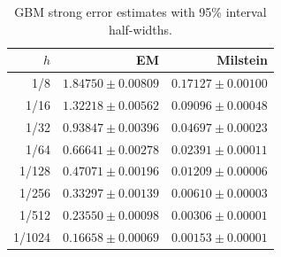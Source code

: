 \begin{table}[H]\centering\small
\caption{GBM strong error estimates with 95\% interval half-widths.}
\begin{tabular}{rrr}\toprule
$h$ & EM & Milstein\\\midrule
1/8 & $1.84750\pm0.00809$ & $0.17127\pm0.00100$\\
1/16 & $1.32218\pm0.00562$ & $0.09096\pm0.00048$\\
1/32 & $0.93847\pm0.00396$ & $0.04697\pm0.00023$\\
1/64 & $0.66641\pm0.00278$ & $0.02391\pm0.00011$\\
1/128 & $0.47071\pm0.00196$ & $0.01209\pm0.00006$\\
1/256 & $0.33297\pm0.00139$ & $0.00610\pm0.00003$\\
1/512 & $0.23550\pm0.00098$ & $0.00306\pm0.00001$\\
1/1024 & $0.16658\pm0.00069$ & $0.00153\pm0.00001$\\
\bottomrule\end{tabular}
\end{table}
